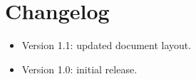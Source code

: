 \chapter{Changelog}
\begin{itemize}
	\item Version 1.1: updated document layout.
	\item Version 1.0: initial release.
\end{itemize}